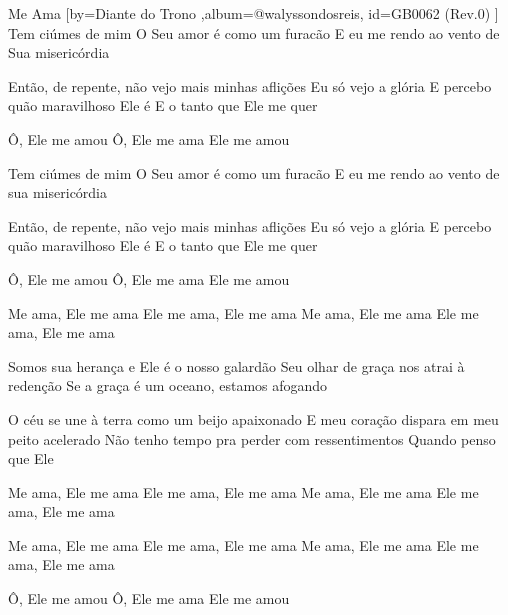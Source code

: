 \beginsong
{Me Ama %
}[by={Diante do Trono %
},album={@walyssondosreis},
id={GB0062 %
(Rev.0) %
}]
Tem ciúmes de mim
O Seu amor é como um furacão
E eu me rendo ao vento de Sua misericórdia

Então, de repente, não vejo mais minhas aflições
Eu só vejo a glória
E percebo quão maravilhoso Ele é
E o tanto que Ele me quer

Ô, Ele me amou
Ô, Ele me ama
Ele me amou

Tem ciúmes de mim
O Seu amor é como um furacão
E eu me rendo ao vento de sua misericórdia

Então, de repente, não vejo mais minhas aflições
Eu só vejo a glória
E percebo quão maravilhoso Ele é
E o tanto que Ele me quer

Ô, Ele me amou
Ô, Ele me ama
Ele me amou

Me ama, Ele me ama
Ele me ama, Ele me ama
Me ama, Ele me ama
Ele me ama, Ele me ama

Somos sua herança e Ele é o nosso galardão
Seu olhar de graça nos atrai à redenção
Se a graça é um oceano, estamos afogando

O céu se une à terra como um beijo apaixonado
E meu coração dispara em meu peito acelerado
Não tenho tempo pra perder com ressentimentos
Quando penso que Ele

Me ama, Ele me ama
Ele me ama, Ele me ama
Me ama, Ele me ama
Ele me ama, Ele me ama

Me ama, Ele me ama
Ele me ama, Ele me ama
Me ama, Ele me ama
Ele me ama, Ele me ama

Ô, Ele me amou
Ô, Ele me ama
Ele me amou


